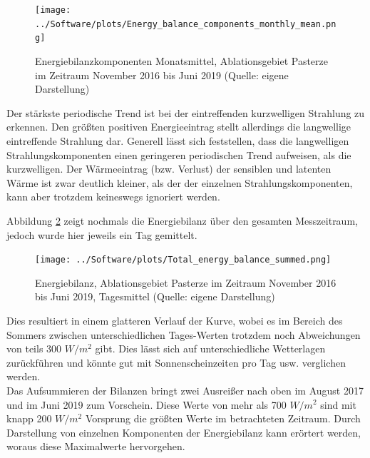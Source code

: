 \documentclass[11pt,a4paper]{article}
\begin{document}
\begin{figure}[H]
\centering
\texttt{[image: ../Software/plots/Energy\_balance\_components\_monthly\_mean.png]}
\caption[Energiebilanzkomponenten Monatsmittel, Ablationsgebiet Pasterze im Zeitraum November 2016 bis Juni 2019]{Energiebilanzkomponenten Monatsmittel, Ablationsgebiet Pasterze im Zeitraum November 2016 bis Juni 2019 (Quelle: eigene Darstellung)}
\label{Energiebilanzkomponenten Monatsmittel}
\end{figure}

Der stärkste periodische Trend ist bei der eintreffenden kurzwelligen Strahlung zu erkennen. Den größten positiven Energieeintrag stellt allerdings die langwellige eintreffende Strahlung dar. Generell lässt sich feststellen, dass die langwelligen Strahlungskomponenten einen geringeren periodischen Trend aufweisen, als die kurzwelligen. Der Wärmeeintrag (bzw. Verlust) der sensiblen und latenten Wärme ist zwar deutlich kleiner, als der der einzelnen Strahlungskomponenten, kann aber trotzdem keineswegs ignoriert werden. 



\pagebreak
Abbildung \ref{Energiebilanz gesamter Messzeitraum, Tagesmittel} zeigt nochmals die Energiebilanz über den gesamten Messzeitraum, jedoch wurde hier jeweils ein Tag gemittelt.

\begin{figure}[H]
\centering
\texttt{[image: ../Software/plots/Total\_energy\_balance\_summed.png]}
\caption[Energiebilanz, Ablationsgebiet Pasterze im Zeitraum November 2016 bis Juni 2019, Tagesmittel]{Energiebilanz, Ablationsgebiet Pasterze im Zeitraum November 2016 bis Juni 2019, Tagesmittel (Quelle: eigene Darstellung)}
\label{Energiebilanz gesamter Messzeitraum, Tagesmittel}
\end{figure}

Dies resultiert in einem glatteren Verlauf der Kurve, wobei es im Bereich des Sommers zwischen unterschiedlichen Tages-Werten trotzdem noch Abweichungen von teils 300 $W/m^2$ gibt. Dies lässt sich auf unterschiedliche Wetterlagen zurückführen und könnte gut mit Sonnenscheinzeiten pro Tag usw. verglichen werden.\\
Das Aufsummieren der Bilanzen bringt zwei Ausreißer nach oben im August 2017 und im Juni 2019 zum Vorschein. Diese Werte von mehr als 700 $W/m^2$ sind mit knapp 200 $W/m^2$ Vorsprung die größten Werte im betrachteten Zeitraum. Durch Darstellung von einzelnen Komponenten der Energiebilanz kann erörtert werden, woraus diese Maximalwerte hervorgehen.\\
\end{document}
